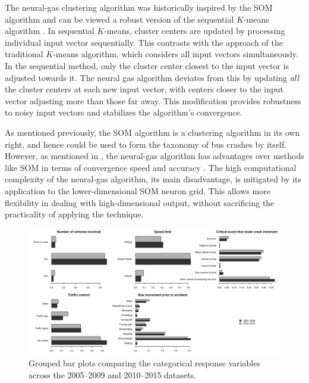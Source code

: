 The neural-gas clustering algorithm was historically inspired by the SOM algorithm and can be viewed a robust version of the sequential $K$-means algorithm \citep{macqueen1967}. In sequential $K$-means, cluster centers are updated by processing individual input vector sequentially. This contrasts with the approach of the traditional $K$-means algorithm, which considers all input vectors simultaneously. In the sequential method, only the cluster center closest to the input vector is adjusted towards it. The neural gas algorithm deviates from this by updating \emph{all} the cluster centers at each new input vector, with centers closer to the input vector adjusting more than those far away. This modification provides robustness to noisy input vectors and stabilizes the algorithm's convergence. \par

As mentioned previously, the SOM algorithm is a clustering algorithm in its own right, and hence could be used to form the taxonomy of bus crashes by itself. However, as mentioned in \citet{prato2013bus}, the neural-gas algorithm has advantages over methods like SOM in terms of convergence speed and accuracy \citep{vesanto2000}. The high computational complexity of the neural-gas algorithm, its main disadvantage, is mitigated by its application to the lower-dimensional SOM neuron grid. This allows more flexibility in dealing with high-dimensional output, without sacrificing the practicality of applying the technique. \par
\begin{figure}[t]
        \includegraphics[width=\textwidth]{radar-bar.png}
                \caption{Grouped bar plots comparing the categorical response variables across the 2005--2009 and 2010--2015 datasets.}
        \label{fig:cat1}
\end{figure}
